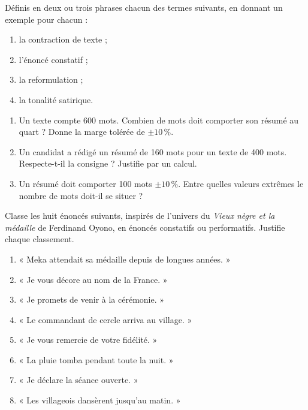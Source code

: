 \documentclass[11pt]{article}
\newcounter{popsec}
\newcounter{popsub}
\newcommand{\courssub}[1]{%
  \stepcounter{popsub}%
  \par\vspace{9pt}\noindent{\popxbold\fontsize{11.5}{13}\selectfont\color{popink}{\color{poporange}\thepopsec.\thepopsub}\hspace{6pt}#1}\par\nopagebreak\vspace{4pt}
}
\begin{document}
\begin{exercice}[Définitions]
Définis en deux ou trois phrases chacun des termes suivants, en donnant un exemple pour chacun :
\begin{enumerate}
\item la contraction de texte ;
\item l'énoncé constatif ;
\item la reformulation ;
\item la tonalité satirique.
\end{enumerate}
\end{exercice}

\begin{exercice}
\begin{enumerate}
\item Un texte compte 600 mots. Combien de mots doit comporter son résumé au quart ? Donne la marge tolérée de $\pm 10\,\%$.
\item Un candidat a rédigé un résumé de 160 mots pour un texte de 400 mots. Respecte-t-il la consigne ? Justifie par un calcul.
\item Un résumé doit comporter 100 mots $\pm 10\,\%$. Entre quelles valeurs extrêmes le nombre de mots doit-il se situer ?
\end{enumerate}
\end{exercice}

\courssub{Je m'entraîne}

\begin{exercice}
Classe les huit énoncés suivants, inspirés de l'univers du \emph{Vieux nègre et la médaille} de Ferdinand Oyono, en énoncés constatifs ou performatifs. Justifie chaque classement.
\begin{enumerate}
\item « Meka attendait sa médaille depuis de longues années. »
\item « Je vous décore au nom de la France. »
\item « Je promets de venir à la cérémonie. »
\item « Le commandant de cercle arriva au village. »
\item « Je vous remercie de votre fidélité. »
\item « La pluie tomba pendant toute la nuit. »
\item « Je déclare la séance ouverte. »
\item « Les villageois dansèrent jusqu'au matin. »
\end{enumerate}
\end{exercice}
\end{document}
